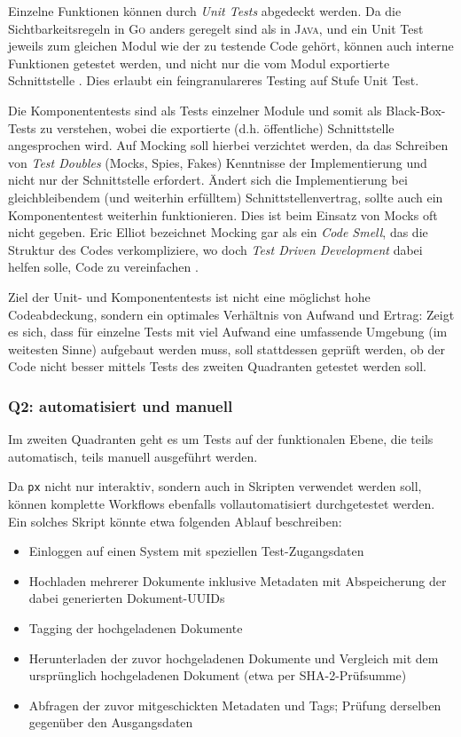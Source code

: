Einzelne Funktionen können durch \textit{Unit Tests} abgedeckt werden. Da die Sichtbarkeitsregeln in \textsc{Go} anders geregelt sind als in \textsc{Java}, und ein Unit Test jeweils zum gleichen Modul wie der zu testende Code gehört, können auch interne Funktionen getestet werden, und nicht nur die vom Modul exportierte Schnittstelle \cite[S. 311]{gopl}. Dies erlaubt ein feingranulareres Testing auf Stufe Unit Test.

Die Komponententests sind als Tests einzelner Module und somit als Black-Box-Tests zu verstehen, wobei die exportierte (d.h. öffentliche) Schnittstelle angesprochen wird. Auf Mocking soll hierbei verzichtet werden, da das Schreiben von \textit{Test Doubles} (Mocks, Spies, Fakes) Kenntnisse der Implementierung und nicht nur der Schnittstelle erfordert. Ändert sich die Implementierung bei gleichbleibendem (und weiterhin erfülltem) Schnittstellenvertrag, sollte auch ein Komponententest weiterhin funktionieren. Dies ist beim Einsatz von Mocks oft nicht gegeben. Eric Elliot bezeichnet Mocking gar als ein \textit{Code Smell}, das die Struktur des Codes verkompliziere, wo doch \textit{Test Driven Development} dabei helfen solle, Code zu vereinfachen \cite[S. 205]{composingsoftware}.

Ziel der Unit- und Komponententests ist nicht eine möglichst hohe Codeabdeckung, sondern ein optimales Verhältnis von Aufwand und Ertrag: Zeigt es sich, dass für einzelne Tests mit viel Aufwand eine umfassende Umgebung (im weitesten Sinne) aufgebaut werden muss, soll stattdessen geprüft werden, ob der Code nicht besser mittels Tests des zweiten Quadranten getestet werden soll.

\subsubsection{Q2: automatisiert und manuell}
\label{sec:Testing-Q2}

Im zweiten Quadranten geht es um Tests auf der funktionalen Ebene, die teils automatisch, teils manuell ausgeführt werden.

Da \texttt{px} nicht nur interaktiv, sondern auch in Skripten verwendet werden soll, können komplette Workflows ebenfalls vollautomatisiert durchgetestet werden. Ein solches Skript könnte etwa folgenden Ablauf beschreiben:

\begin{itemize}
	\item Einloggen auf einen System mit speziellen Test-Zugangsdaten
	\item Hochladen mehrerer Dokumente inklusive Metadaten mit Abspeicherung der dabei generierten Dokument-UUIDs
	\item Tagging der hochgeladenen Dokumente
	\item Herunterladen der zuvor hochgeladenen Dokumente und Vergleich mit dem ursprünglich hochgeladenen Dokument (etwa per SHA-2-Prüfsumme)
	\item Abfragen der zuvor mitgeschickten Metadaten und Tags; Prüfung derselben gegenüber den Ausgangsdaten
\end{itemize}

